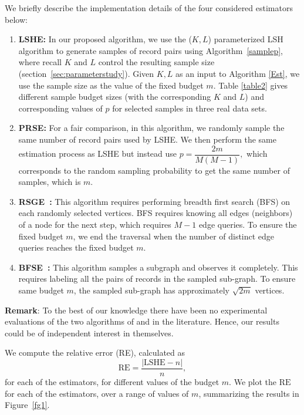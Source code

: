 \documentclass{imsart}
\begin{document}
We briefly describe the implementation details of the four considered estimators below:
\begin{enumerate}
\item \textbf{LSHE:} In our proposed algorithm, we use the ($K, L$) parameterized LSH algorithm to generate samples of record pairs using Algorithm~\ref{samplep}, where recall $K$ and $L$ control the resulting sample size (section~\ref{sec:parameterstudy}). Given $K, L$ as an input to Algorithm \ref{Est}, we use the sample size as the value of the fixed budget $m$. Table \ref{table2} gives different sample budget sizes (with the corresponding $K$ and $L$) and corresponding values of $p$ for selected samples in three real data sets.
\item \textbf{PRSE:} For a fair comparison, in this algorithm, we randomly sample the same number of record pairs used by LSHE. We then perform the same estimation process as LSHE but instead use $p = \dfrac{2m}{M(M-1)},$ which corresponds to the random sampling probability to get the same number of samples, which is $m$.
\item \textbf{RSGE~\citep{1978paper}:} This algorithm requires performing breadth first search (BFS) on each randomly selected vertices. BFS requires knowing all edges (neighbors) of a node for the next step, which requires $M-1$ edge queries. To ensure the fixed budget $m$, we end the traversal when the number of distinct edge queries reaches the fixed budget $m$.

\item \textbf{BFSE~\citep{chazelle2005approximating}:} This algorithm samples a subgraph and observes it completely. This requires labeling all the pairs of records in the sampled sub-graph. To ensure same budget $m$, the sampled sub-graph has approximately $\sqrt{2m}$ vertices.
\end{enumerate}

\textbf{Remark}: To the best of our knowledge there have been no experimental evaluations of the two algorithms of \cite{1978paper} and \cite{chazelle2005approximating} in the literature. Hence, our results could be of independent interest in themselves.

We compute the relative error (RE), calculated as $$\text{RE} = \dfrac{|\text{LSHE} - n|}{n},$$ for each of the estimators, for different values of the budget $m$. We plot the $\text{RE}$ for each of the estimators, over a range of values of $m$, summarizing the results in Figure~\ref{fg1}.
\end{document}
